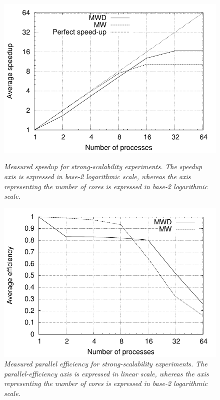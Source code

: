 \begin{figure}
\begin{minipage}[t]{0.45\textwidth}%
\centering

\includegraphics[width=1\columnwidth]{04-framework_design_and_implementation/img/strong_scaling-speedup_plot}

\caption{\textit{\emph{Measured speedup for strong-scalability experiments.}}\textit{
}\textit{\emph{The speedup axis is expressed in base-2 logarithmic
scale, whereas the axis representing the number of cores is expressed
in base-2 logarithmic scale.\label{fig:strong_scalability_speedup}}}}
%
\end{minipage}\hfill{}%
\begin{minipage}[t]{0.45\textwidth}%
\centering

\includegraphics[width=1\columnwidth]{04-framework_design_and_implementation/img/strong_scaling-efficiency_plot}

\caption{\textit{\emph{Measured parallel efficiency for strong-scalability
experiments.}}\textit{ }\textit{\emph{The parallel-efficiency axis
is expressed in linear scale, whereas the axis representing the number
of cores is expressed in base-2 logarithmic scale.\label{fig:strong_scalability_efficiency}}}}
%
\end{minipage}
\end{figure}


